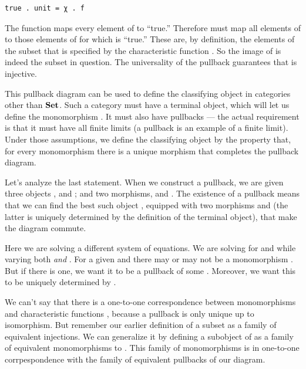 \begin{Verbatim}[commandchars=\\\{\}]
true . unit = χ . f
\end{Verbatim}
The function  maps every element of  to
``true.'' Therefore  must map all elements of  to
those elements of  for which  is ``true.'' These
are, by definition, the elements of the subset that is specified by the
characteristic function . So the image of  is indeed
the subset in question. The universality of the pullback guarantees that
 is injective.

This pullback diagram can be used to define the classifying object in
categories other than $\mathbf{Set}$. Such a category must have a terminal
object, which will let us define the monomorphism . It must
also have pullbacks --- the actual requirement is that it must have all
finite limits (a pullback is an example of a finite limit). Under those
assumptions, we define the classifying object  by the property
that, for every monomorphism  there is a unique morphism
 that completes the pullback diagram.

Let's analyze the last statement. When we construct a pullback, we are
given three objects ,  and ; and two
morphisms,  and . The existence of a pullback
means that we can find the best such object , equipped with
two morphisms  and  (the latter is uniquely
determined by the definition of the terminal object), that make the
diagram commute.

Here we are solving a different system of equations. We are solving for
 and  while varying both  \emph{and}
. For a given  and  there may or may not
be a monomorphism . But if there is one, we
want it to be a pullback of some . Moreover, we want this
 to be uniquely determined by .

We can't say that there is a one-to-one correspondence between
monomorphisms  and characteristic functions ,
because a pullback is only unique up to isomorphism. But remember our
earlier definition of a subset as a family of equivalent injections. We
can generalize it by defining a subobject of  as a family of
equivalent monomorphisms to . This family of monomorphisms is
in one-to-one corrpespondence with the family of equivalent pullbacks of
our diagram.


